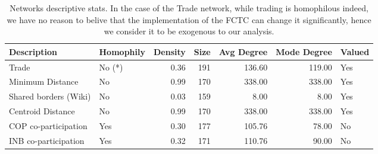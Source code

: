 \begin{table}[ht]
\centering
\begin{tabular}{llrrrrl}
  \toprule
Description & Homophily & Density & Size & Avg Degree & Mode Degree & Valued \\ 
  \midrule
Trade & No (*) & 0.36 & 191 & 136.60 & 119.00 & Yes \\ 
  Minimum Distance & No & 0.99 & 170 & 338.00 & 338.00 & Yes \\ 
  Shared borders (Wiki) & No & 0.03 & 159 & 8.00 & 8.00 & Yes \\ 
  Centroid Distance & No & 0.99 & 170 & 338.00 & 338.00 & Yes \\ 
  COP co-participation & Yes & 0.30 & 177 & 105.76 & 78.00 & No \\ 
  INB co-participation & Yes & 0.32 & 171 & 110.76 & 90.00 & No \\ 
   \bottomrule
\end{tabular}
\caption{Networks descriptive stats. In the case of the Trade network, while trading is homophilous indeed, we have no reason to belive that the implementation of the FCTC can change it significantly, hence we consider it to be exogenous to our analysis.} 
\end{table}
